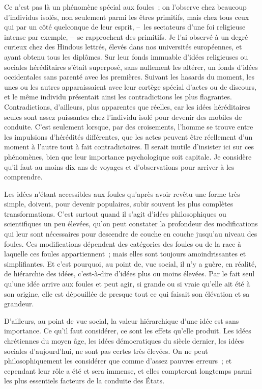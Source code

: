 \documentclass[french,twoside]{book} %
\begin{document}
Ce n’est pas là un phénomène spécial aux foules ; on l’observe chez beaucoup d’individus isolés, non seulement parmi les êtres primitifs, mais chez tous ceux qui par un côté quelconque de leur esprit, – les sectateurs d’une foi religieuse intense par exemple, – se rapprochent des primitifs. Je l’ai observé à un degré curieux chez des Hindous lettrés, élevés dans nos universités européennes, et ayant obtenu tous les diplômes. Sur leur fonds immuable d’idées religieuses ou sociales héréditaires s’était superposé, sans nullement les altérer, un fonds d’idées occidentales sans parenté avec les premières. Suivant les hasards du moment, les unes ou les autres apparaissaient avec leur cortège spécial d’actes ou de discours, et le même individu présentait ainsi les contradictions les plus flagrantes. Contradictions, d’ailleurs, plus apparentes que réelles, car les idées héréditaires seules sont assez puissantes chez l’individu isolé pour devenir des mobiles de conduite. C’est seulement lorsque, par des croisements, l’homme se trouve entre les impulsions d’hérédités différentes, que les actes peuvent être réellement d’un moment à l’autre tout à fait contradictoires. Il serait inutile d’insister ici sur ces phénomènes, bien que leur importance psychologique soit capitale. Je considère qu’il faut au moins dix ans de voyages et d’observations pour arriver à les comprendre.\par
Les idées n’étant accessibles aux foules qu’après avoir revêtu une forme très simple, doivent, pour devenir populaires, subir souvent les plus complètes transfor­mations. C’est surtout quand il s’agit d’idées philosophiques ou scientifiques un peu élevées, qu’on peut constater la profondeur des modifications qui leur sont nécessaires pour descendre de couche en couche jusqu’au niveau des foules. Ces modifications dépendent des catégories des foules ou de la race à laquelle ces foules appartiennent ; mais elles sont toujours amoindrissantes et simplifiantes. Et c’est pour­quoi, au point de, vue social, il n’y a guère, en réalité, de hiérarchie des idées, c’est-à-dire d’idées plus ou moins élevées. Par le fait seul qu’une idée arrive aux foules et peut agir, si grande ou si vraie qu’elle ait été à son origine, elle est dépouillée de presque tout ce qui faisait son élévation et sa grandeur.\par
D’ailleurs, au point de vue social, la valeur hiérarchique d’une idée est sans impor­tance. Ce qu’il faut considérer, ce sont les effets qu’elle produit. Les idées chrétiennes du moyen âge, les idées démocratiques du siècle dernier, les idées sociales d’aujourd’hui, ne sont pas certes très élevées. On ne peut philosophiquement les consi­dérer que comme d’assez pauvres erreurs ; et cependant leur rôle a été et sera immense, et elles compteront longtemps parmi les plus essentiels facteurs de la conduite des États.\par
\end{document}
